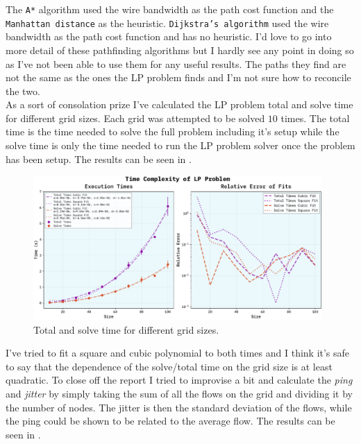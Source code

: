 \documentclass[10pt, titlepage, a4paper]{article}
\begin{document}
The \texttt{A*} algorithm used the wire bandwidth as the path cost function and the \texttt{Manhattan distance} as the heuristic. 
\texttt{Dijkstra's algorithm} used the wire bandwidth as the path cost function and has no heuristic. I'd love to go into more detail of 
these pathfinding algorithms but I hardly see any point in doing so as I've not been able to use them for any useful results. The paths 
they find are not the same as the ones the LP problem finds and I'm not sure how to reconcile the two. \\

As a sort of consolation prize I've calculated the LP problem total and solve time for different grid sizes. Each grid was attempted to be 
solved $10$ times. The total time is the time needed to solve the full problem including it's setup while the solve time is only the time needed to 
run the LP problem solver once the problem has been setup. The results can be seen in \textcolor{red}{}.

\begin{figure}[H]
    \centering
    \includegraphics[width=0.98\textwidth]{../Images/time-complexity.pdf}
    \caption{Total and solve time for different grid sizes.}
    \label{fig:time}
\end{figure}

I've tried to fit a square and cubic polynomial to both times and I think it's safe to say that the dependence of the 
solve/total time on the grid size is at least quadratic. To close off the report I tried to improvise a bit and calculate the 
\textit{ping} and \textit{jitter} by simply taking the sum of all the flows on the grid and dividing it by the number of
nodes. The jitter is then the standard deviation of the flows, while the ping could be shown to be related to the average flow.
The results can be seen in \textcolor{red}{}.
\end{document}
